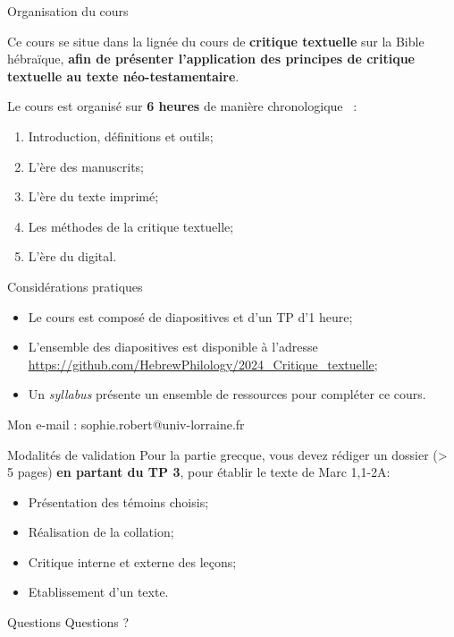 \documentclass[11pt]{beamer}
\begin{document}
\subtitle{Session 2 : Nouveau Testament}

\begin{frame}{}
	\titlepage
\end{frame}


\begin{frame}{Organisation du cours}
\begin{alertblock}{}
    Ce cours se situe dans la lignée du cours de \textbf{critique textuelle} sur la Bible hébraïque, \textbf{afin de présenter l'application des principes de critique textuelle au texte néo-testamentaire}.
    \pause
    
\end{alertblock}
Le cours est organisé sur \textbf{6 heures} de manière \og chronologique \fg\ :

\begin{enumerate}
    \item Introduction, définitions et outils;
    \item L'ère des manuscrits;
    \item L'ère du texte imprimé;
    \item Les méthodes de la critique textuelle;
    \item L'ère du digital.
\end{enumerate}
\end{frame}

\begin{frame}{Considérations pratiques}

\begin{itemize}
    \item Le cours est composé de diapositives et d'un TP d'1 heure;
    \item L'ensemble des diapositives est disponible à l'adresse \url{https://github.com/HebrewPhilology/2024_Critique_textuelle};
    \item Un \textit{syllabus} présente un ensemble de ressources pour compléter ce cours.
\end{itemize}

\begin{alertblock}{}
    Mon e-mail : sophie.robert@univ-lorraine.fr
\end{alertblock}
\end{frame}


\begin{frame}{Modalités de validation}
    Pour la partie grecque, vous devez rédiger un dossier (> 5 pages) \textbf{en partant du TP 3}, pour établir le texte de Marc 1,1-2A:
    \begin{itemize}
        \item Présentation des témoins choisis;
        \item Réalisation de la collation;
        \item Critique interne et externe des leçons;
        \item Etablissement d'un texte.
    \end{itemize}
\end{frame}

\begin{frame}{Questions}
Questions ?
\end{frame}
\end{document}
